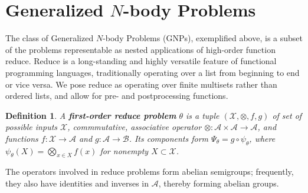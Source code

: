 \documentclass{article}
\newtheorem{definition} {Definition}
\newcommand{\killspace}{\vspace{-0.08in}}
\newcommand{\mysection}[1]{\vspace{-0.04in}\section{#1}\killspace}
\newcommand{\comp}{\mathbin{\circ}}
\begin{document}
%  
%  
%  
%  

\mysection{Generalized $N$-body Problems}

The class of Generalized $N$-body Problems (GNPs), exemplified above,
is a subset of the problems representable as nested applications of
high-order function reduce.  Reduce is a long-standing and highly
versatile feature of functional programming languages, traditionally
operating over a list from beginning to end or vice versa.  We pose
reduce as operating over finite multisets
rather than ordered lists, and allow for pre- and postprocessing
functions.
\begin{definition}
  A {\bf first-order reduce problem} $\theta$ is a tuple
  $(\mathcal{X},\otimes,f,g)$ of set of possible inputs $\mathcal{X}$,
  commmutative, associative operator $\otimes \colon \mathcal{A}
  \times \mathcal{A} \to \mathcal{A}$, and functions $f \colon
  \mathcal{X} \to \mathcal{A}$ and $g \colon \mathcal{A} \to
  \mathcal{B}$.  Its components form $\Psi_{\theta} = g \comp
  \psi_{\theta}$, where $\psi_{\theta}(X) = \bigotimes_{x \in X} f(x)$
  for nonempty $X \subset \mathcal{X}$.
\end{definition}
\killspace
\noindent The operators involved in reduce problems form abelian
semigroups; frequently, they also have identities and inverses in
$\mathcal{A}$, thereby forming abelian groups.
\end{document}
